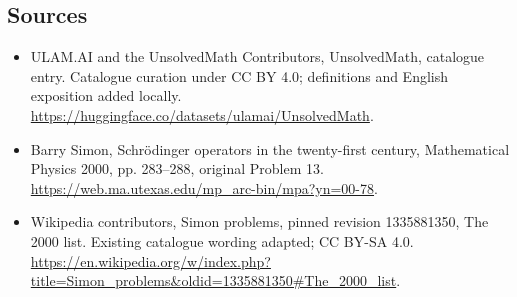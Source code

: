\documentclass[11pt]{article}
\begin{document}
\subsection{Sources}
\begin{itemize}
\item[\hypertarget{source:statement:1}{S1}] ULAM.AI and the UnsolvedMath Contributors, UnsolvedMath, catalogue entry. Catalogue curation under CC BY 4.0; definitions and English exposition added locally.
\url{https://huggingface.co/datasets/ulamai/UnsolvedMath}.
\item[\hypertarget{source:statement:2}{S2}] Barry Simon, Schrödinger operators in the twenty-first century, Mathematical Physics 2000, pp. 283–288, original Problem 13.
\url{https://web.ma.utexas.edu/mp_arc-bin/mpa?yn=00-78}.
\item[\hypertarget{source:statement:3}{S3}] Wikipedia contributors, Simon problems, pinned revision 1335881350, The 2000 list. Existing catalogue wording adapted; CC BY-SA 4.0.
\url{https://en.wikipedia.org/w/index.php?title=Simon_problems&oldid=1335881350#The_2000_list}.
\end{itemize}
\label{end:statement}
\end{document}

